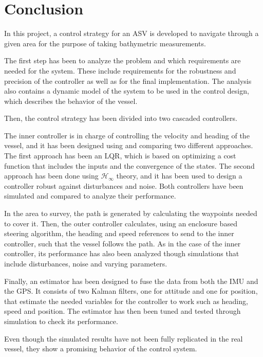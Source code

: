 \chapter{Conclusion}\label{chap:conclusion}

In this project, a control strategy for an ASV is developed to navigate through a given area for the purpose of taking bathymetric measurements.

The first step has been to analyze the problem and which requirements are needed for the system. These include requirements for the robustness and precision of the controller as well as for the final implementation. The analysis also contains a dynamic model of the system to be used in the control design, which describes the behavior of the vessel.

Then, the control strategy has been divided into two cascaded controllers. 

The inner controller is in charge of controlling the velocity and heading of the vessel, and it has been designed using and comparing two different approaches. The first approach has been an LQR, which is based on optimizing a cost function that includes the inputs and the convergence of the states. The second approach has been done using $\mathcal{H}_\infty$ theory, and it has been used to design a controller robust against disturbances and noise. Both controllers have been simulated and compared to analyze their performance.

In the area to survey, the path is generated by calculating the waypoints needed to cover it. Then, the outer controller calculates, using an enclosure based steering algorithm, the heading and speed references to send to the inner controller, such that the vessel follows the path. As in the case of the inner controller, its performance has also been analyzed though simulations that include disturbances, noise and varying parameters.

Finally, an estimator has been designed to fuse the data from both the IMU and the GPS. It consists of two Kalman filters, one for attitude and one for position, that estimate the needed variables for the controller to work such as heading, speed and position. The estimator has then been tuned and tested through simulation to check its performance.

Even though the simulated results have not been fully replicated in the real vessel, they show a promising behavior of the control system.

